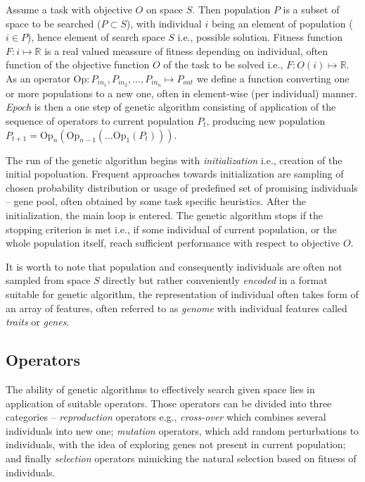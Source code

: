 Assume a task with objective $O$ on space $S$. Then population $P$ is a subset of space to be searched ($P \subset S$), with individual $i$ being an element of population ($i \in P$), hence element of search space $S$ i.e., possible solution. Fitness function $F: i \mapsto \mathbb{R}$ is a real valued meassure of fitness depending on individual, often function of the objective function $O$ of the task to be solved i.e., $F: O(i) \mapsto \mathbb{R}$. As an operator $\text{Op}: P_{in_1}, P_{in_2}, \dots, P_{in_n} \mapsto P_{out}$ we define a function converting one or more populations to a new one, often in element-wise (per individual) manner. \emph{Epoch} is then a one step of genetic algorithm consisting of application of the sequence of operators to current population $P_t$, producing new population $P_{t+1} = \text{Op}_n\left(\text{Op}_{n-1}\left(\dots \text{Op}_1(P_t)\right)\right)$.

The run of the genetic algorithm begins with \emph{initialization} i.e., creation of the initial popoluation. Frequent approaches towards initialization are sampling of chosen probability distribution or usage of predefined set of promising individuals -- gene pool, often obtained by some task specific heuristics. After the initialization, the main loop is entered. The genetic algorithm stops if the stopping criterion is met i.e., if some individual of current population, or the whole population itself, reach sufficient performance with respect to objective $O$.

It is worth to note that population and consequently individuals are often not sampled from space $S$ directly but rather conveniently \emph{encoded} in a format suitable for genetic algorithm, the representation of individual often takes form of an array of features, often referred to as \emph{genome} with individual features called \emph{traits} or \emph{genes}.

\subsection{Operators}
The ability of genetic algorithms to effectively search given space lies in application of suitable operators. Those operators can be divided into three categories -- \emph{reproduction} operators e.g., \emph{cross-over} which combines several individuals into new one; \emph{mutation} operators, which add random perturbations to individuals, with the idea of exploring genes not present in current population; and finally \emph{selection} operators mimicking the natural selection based on fitness of individuals.

